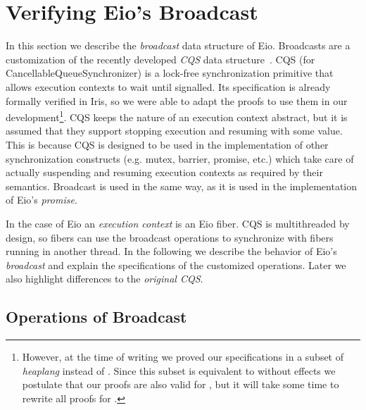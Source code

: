 \section{Verifying Eio's Broadcast}
\label{sec:broadcast}


In this section we describe the \emph{broadcast} data structure of Eio.
Broadcasts are a customization of the recently developed \emph{CQS} data structure~\cite{koval2023cqs}.
CQS (for CancellableQueueSynchronizer) is a lock-free synchronization primitive that allows execution contexts to wait until signalled.
Its specification is already formally verified in Iris, so we were able to adapt the proofs to use them in our development\footnote{However, at the time of writing we proved our specifications in a subset of \emph{heaplang} instead of \hh{}. Since this subset is equivalent to \hh{} without effects we postulate that our proofs are also valid for \hh{}, but it will take some time to rewrite all proofs for \hh{}.}.
CQS keeps the nature of an execution context abstract, but it is assumed that they support stopping execution and resuming with some value.
This is because CQS is designed to be used in the implementation of other synchronization constructs (e.g. mutex, barrier, promise, etc.) which take care of actually suspending and resuming execution contexts as required by their semantics.
Broadcast is used in the same way, as it is used in the implementation of Eio's \emph{promise}.


In the case of Eio an \emph{execution context} is an Eio fiber.
CQS is multithreaded by design, so fibers can use the broadcast operations to synchronize with fibers running in another thread.
In the following we describe the behavior of Eio's \emph{broadcast} and explain the specifications of the customized operations.
Later we also highlight differences to the \emph{original CQS}.

\subsection{Operations of Broadcast}
\label{sec:broadcast-operations}


